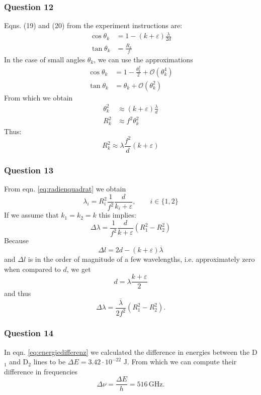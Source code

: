\subsubsection{Question 12}
Eqns. (19) and (20) from the experiment instructions \cite{anleitungZEEMAN} are:
\begin{align}
	\cos \theta_k &=1-(k+\varepsilon)\frac{\lambda}{2d}\\
	\tan\theta_k &=\frac{R_k}{f}
\end{align}
In the case of small angles $\theta_k$, we can use the approximations
\begin{align}
	\cos\theta_k&=1-\frac{\theta_k^2}{2}+\mathcal O(\theta_k^4)\\
	\tan \theta_k &= \theta_k +\mathcal O (\theta_k^2)
\end{align}
From which we obtain
\begin{align}
	\theta_k^2&\approx (k+\varepsilon)\frac{\lambda}{d}\\
	R_k^2&\approx f^2 \theta_k^2
\end{align}
Thus:
\begin{equation}
	R_k^2\approx \lambda \frac{f^2}{d}(k+\varepsilon)\label{eq:radienquadrat}
\end{equation}
\subsubsection{Question 13}
From eqn. \eqref{eq:radienquadrat} we obtain
\begin{equation}
		\lambda_i=R^2_i \frac{1}{f^2}\frac{d}{k_i+\varepsilon}, \qquad i \in\{1,2\}
\end{equation}
If we assume that $k_1=k_2=k$ this implies:
\begin{equation}
	\Delta \lambda = \frac{1}{f^2} \frac{d}{k+\varepsilon} (R_1^2-R_2^2)
\end{equation}
Because 
\begin{equation}
	\Delta l = 2d-(k+\varepsilon)\overline\lambda
\end{equation}
and $\Delta l$ is in the order of magnitude of a few wavelengths, i.e. approximately zero when compared to $d$, we get
\begin{equation}
	d=\lambda\frac{k+\varepsilon}{2}
\end{equation}
and thus
\begin{equation}
	\Delta \lambda = \frac{\overline \lambda}{2f^2}(R_1^2-R_2^2).
\end{equation}
\subsubsection{Question 14}
In eqn. \eqref{eq:energiedifferenz} we calculated the difference in energies between the D$_1$ and D$_2$ lines to be $\Delta E=3.42\cdot 10^{-22}$ \si{\joule}. From which we can compute their difference in frequencies 
\begin{equation}
	\Delta \nu = \frac{\Delta E}{h}=516 \,\si{\giga\hertz}.
\end{equation}
